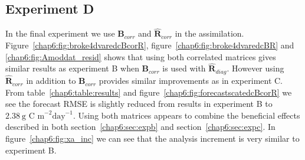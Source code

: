 \subsection{Experiment D}

In the final experiment we use $\textbf{B}_{corr}$ and $\hat{\textbf{R}}_{corr}$ in the assimilation. Figure~\ref{chap6:fig:broke4dvaredcBcorR}, figure~\ref{chap6:fig:broke4dvaredcBR} and \ref{chap6:fig:Amoddat_resid} shows that using both correlated matrices gives similar results as experiment B when $\textbf{B}_{corr}$ is used with $\hat{\textbf{R}}_{diag}$. However using $\hat{\textbf{R}}_{corr}$ in addition to $\textbf{B}_{corr}$ provides similar improvements as in experiment C. From table~\ref{chap6:table:results} and figure~\ref{chap6:fig:forecastscatedcBcorR} we see the forecast RMSE is slightly reduced from results in experiment B to $2.38 ~\text{g C m}^{-2}\text{day}^{-1}$. Using both matrices appears to combine the beneficial effects described in both section~\ref{chap6:sec:expb} and section~\ref{chap6:sec:expc}. In figure~\ref{chap6:fig:xa_inc} we can see that the analysis increment is very similar to experiment B.

